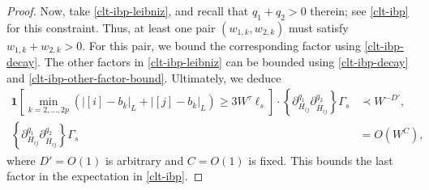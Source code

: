 \begin{proof}
Now, take \eqref{clt-ibp-leibniz}, and recall that $q_{1}+q_{2}>0$ therein; see \eqref{clt-ibp} for this constraint. Thus, at least one pair $(w_{1,k},w_{2,k})$ must satisfy $w_{1,k}+w_{2,k}>0$. For this pair, we bound the corresponding factor using \eqref{clt-ibp-decay}. The other factors in \eqref{clt-ibp-leibniz} can be bounded using \eqref{clt-ibp-decay} and \eqref{clt-ibp-other-factor-bound}. Ultimately, we deduce
%
\begin{align}
\mathbf{1}\left[\min_{k=2,\ldots,2p}(|[i]-b_{k}|_{L}+|[j]-b_{k}|_{L})\geq 3W^{\tau}\ell_{s}\right]\cdot \left\{\partial_{H_{ij}}^{q_{1}}\partial_{\overline{H}_{ij}}^{q_{2}}\right\}\Gamma_{s}&\prec W^{-D'},\label{clt-ibp-bound1}\\
\left\{\partial_{H_{ij}}^{q_{1}}\partial_{\overline{H}_{ij}}^{q_{2}}\right\}\Gamma_{s}&=O(W^{C}),\label{clt-ibp-bound2}
\end{align}
%
where $D'=O(1)$ is arbitrary and $C=O(1)$ is fixed. This bounds the last factor in the expectation in \eqref{clt-ibp}. 


\end{proof}
